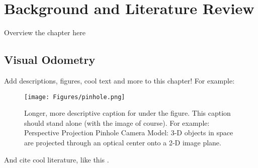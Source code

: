 \chapter{Background and Literature Review}
\label{ch:background}
\glsresetall
{
Overview the chapter here}

\section{Visual Odometry}
\label{sec:VO}

Add descriptions, figures, cool text and more to this chapter!  For example: 

\begin{figure}[tb!]
	\centering
	\texttt{[image: Figures/pinhole.png]}
	\caption[Short Caption For Table of Contents]{Longer, more descriptive caption for under the figure.  This caption should stand alone (with the image of course).  For example: Perspective Projection Pinhole Camera Model: 3-D objects in space are projected through an optical center onto a 2-D image plane.}
	\label{fig:pinhole}
\end{figure}

And cite cool literature, like this \cite{Scaramuzza2011}.
